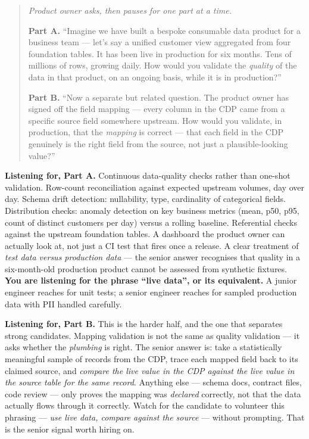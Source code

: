 \documentclass[
  11pt,
  british,
  oneside]{book}
\begin{document}
\begin{quote}
\emph{Product owner asks, then pauses for one part at a time.}

\textbf{Part A.} ``Imagine we have built a bespoke consumable data
product for a business team --- let's say a unified customer view
aggregated from four foundation tables. It has been live in production
for six months. Tens of millions of rows, growing daily. How would you
validate the \emph{quality} of the data in that product, on an ongoing
basis, while it is in production?''

\textbf{Part B.} ``Now a separate but related question. The product
owner has signed off the field mapping --- every column in the CDP came
from a specific source field somewhere upstream. How would you validate,
in production, that the \emph{mapping} is correct --- that each field in
the CDP genuinely is the right field from the source, not just a
plausible-looking value?''
\end{quote}

\textbf{Listening for, Part A.} Continuous data-quality checks rather
than one-shot validation. Row-count reconciliation against expected
upstream volumes, day over day. Schema drift detection: nullability,
type, cardinality of categorical fields. Distribution checks: anomaly
detection on key business metrics (mean, p50, p95, count of distinct
customers per day) versus a rolling baseline. Referential checks against
the upstream foundation tables. A dashboard the product owner can
actually look at, not just a CI test that fires once a release. A clear
treatment of \emph{test data versus production data} --- the senior
answer recognises that quality in a six-month-old production product
cannot be assessed from synthetic fixtures. \textbf{You are listening
for the phrase ``live data'', or its equivalent.} A junior engineer
reaches for unit tests; a senior engineer reaches for sampled production
data with PII handled carefully.

\textbf{Listening for, Part B.} This is the harder half, and the one
that separates strong candidates. Mapping validation is not the same as
quality validation --- it asks whether the \emph{plumbing} is right. The
senior answer is: take a statistically meaningful sample of records from
the CDP, trace each mapped field back to its claimed source, and
\emph{compare the live value in the CDP against the live value in the
source table for the same record}. Anything else --- schema docs,
contract files, code review --- only proves the mapping was
\emph{declared} correctly, not that the data actually flows through it
correctly. Watch for the candidate to volunteer this phrasing ---
\emph{use live data, compare against the source} --- without prompting.
That is the senior signal worth hiring on.
\end{document}
